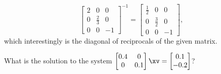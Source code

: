 \begin{example}
\begin{solution}
\begin{equation*}
\begin{bmatrix} 2&0&0\\0&\frac23&0\\0&0&-1 \end{bmatrix}^{-1}
=\begin{bmatrix} \frac12&0&0\\0&\frac32&0\\0&0&-1 \end{bmatrix},
\end{equation*}
which interestingly is the diagonal of reciprocals of the given matrix.
\end{solution}
\end{example}




\begin{activity}
What is the solution to the system \(\begin{bmatrix} 0.4&0\\0&0.1 \end{bmatrix}\xv=\begin{bmatrix} 0.1\\-0.2 \end{bmatrix}\)?
\end{activity}



\begin{comment}
Diagonal matrices are `stretchers' in the coordinate directions, e.g.~the rack.  They also can reflect which changes orientation.  They are a first example of a {linear transform}.  Their inverse has to undo the stretching.
\end{comment}

